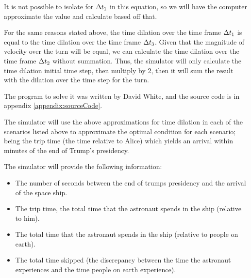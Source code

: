 		It is not possible to isolate for $\mathrm{\Delta} t_1$ in this equation, so we will have the computer approximate the value and calculate based
		off that.

		For the same reasons stated above, the time dilation over the time frame $\mathrm{\Delta} t_1$ is equal to the time dilation over the time frame
		$\mathrm{\Delta} t_3$. Given that the magnitude of velocity over the turn will be equal, we can calculate the time dilation over the time frame
		$\mathrm{\Delta} t_2$ without summation. Thus, the simulator will only calculate the time dilation initial time step, then multiply by 2, then 
		it will sum the result with the dilation over the time step for the turn.

		The program to solve it was written by David White, and the source code is in appendix \vref{appendix:sourceCode}.

		The simulator will use the above approximations for time dilation in each of the scenarios listed above to approximate the optimal
		condition for each scenario; being the trip time (the time relative to Alice) which yields an arrival within minutes of the
		end of Trump's presidency.

		The simulator will provide the following information:
		\begin{itemize}
			\item The number of seconds between the end of trumps presidency and the arrival of the space ship.
			\item The trip time, the total time that the astronaut spends in the ship (relative to him).
			\item The total time that the astronaut spends in the ship (relative to people on earth).
			\item The total time skipped (the discrepancy between the time the astronaut experiences and the time people on earth experience).
		\end{itemize}
